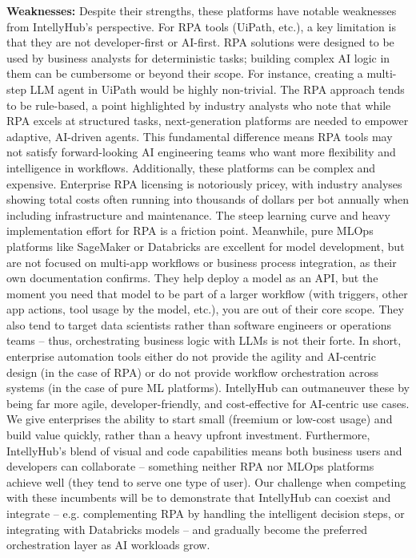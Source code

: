 \textbf{Weaknesses:} Despite their strengths, these platforms have notable weaknesses from IntellyHub's perspective. For RPA tools (UiPath, etc.), a key limitation is that they are not developer-first or AI-first. RPA solutions were designed to be used by business analysts for deterministic tasks; building complex AI logic in them can be cumbersome or beyond their scope. For instance, creating a multi-step LLM agent in UiPath would be highly non-trivial. The RPA approach tends to be rule-based, a point highlighted by industry analysts who note that while RPA excels at structured tasks, next-generation platforms are needed to empower adaptive, AI-driven agents\cite{forresterRPAvsAI}. This fundamental difference means RPA tools may not satisfy forward-looking AI engineering teams who want more flexibility and intelligence in workflows. Additionally, these platforms can be complex and expensive. Enterprise RPA licensing is notoriously pricey, with industry analyses showing total costs often running into thousands of dollars per bot annually when including infrastructure and maintenance. The steep learning curve and heavy implementation effort for RPA is a friction point. Meanwhile, pure MLOps platforms like SageMaker or Databricks are excellent for model development, but are not focused on multi-app workflows or business process integration, as their own documentation confirms\cite{awsSagemaker}. They help deploy a model as an API, but the moment you need that model to be part of a larger workflow (with triggers, other app actions, tool usage by the model, etc.), you are out of their core scope. They also tend to target data scientists rather than software engineers or operations teams – thus, orchestrating business logic with LLMs is not their forte. In short, enterprise automation tools either do not provide the agility and AI-centric design (in the case of RPA) or do not provide workflow orchestration across systems (in the case of pure ML platforms). IntellyHub can outmaneuver these by being far more agile, developer-friendly, and cost-effective for AI-centric use cases. We give enterprises the ability to start small (freemium or low-cost usage) and build value quickly, rather than a heavy upfront investment. Furthermore, IntellyHub's blend of visual and code capabilities means both business users and developers can collaborate – something neither RPA nor MLOps platforms achieve well (they tend to serve one type of user). Our challenge when competing with these incumbents will be to demonstrate that IntellyHub can coexist and integrate – e.g. complementing RPA by handling the intelligent decision steps, or integrating with Databricks models – and gradually become the preferred orchestration layer as AI workloads grow.


